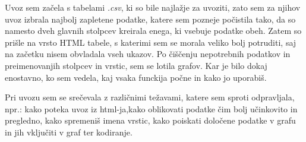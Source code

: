 \documentclass[11pt,a4paper]{article}
\begin{document}
Uvoz sem začela s tabelami \textit{.csv}, ki so bile najlažje za uvoziti, zato sem za njihov uvoz izbrala najbolj zapletene podatke, katere sem pozneje počistila tako, da so namesto dveh glavnih stolpcev kreirala enega, ki vsebuje podatke obeh. Zatem so prišle na vrsto HTML tabele, s katerimi sem se morala veliko bolj potruditi, saj na začetku nisem obvladala vseh ukazov. Po čiščenju nepotrebnih podatkov in preimenovanjih stolpcev in vrstic, sem se lotila grafov. Kar je bilo dokaj enostavno, ko sem vedela, kaj vsaka funckija počne in kako jo uporabiš.

 Pri uvozu sem se srečevala z različnimi težavami, katere sem sproti odpravljala, npr.: kako poteka uvoz iz html-ja,kako oblikovati podatke čim bolj učinkovito in pregledno, kako spremeniš imena vrstic, kako poiskati določene podatke v grafu in jih vključiti v graf ter kodiranje.
\end{document}
